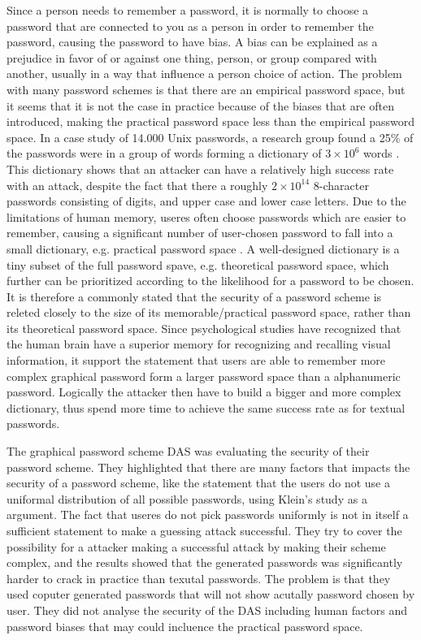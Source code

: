   Since a person needs to remember a password, it is normally to choose a password that are connected to you as a person in order to remember the password, causing the password to have bias. A bias can be explained as a prejudice in favor of or against one thing, person, or group compared with another, usually in a way that influence a person choice of action. The problem with many password schemes is that there are an empirical password space, but it seems that it is not the case in practice because of the biases that are often introduced, making the practical password space less than the empirical password space. In a case study of 14.000 Unix passwords, a research group found a 25\% of the passwords were in a group of words forming a dictionary of $3\times10^{6}$ words \cite{UnixPasswords}. This dictionary shows that an attacker can have a relatively high success rate with an attack, despite the fact that there a roughly $2\times10^{14}$ 8-character passwords consisting of digits, and upper case and lower case letters. Due to the limitations of human memory, useres often choose passwords which are easier to remember, causing a significant number of user-chosen password to fall into a small dictionary, e.g. practical password space \cite{Tao}. A well-designed dictionary is a tiny subset of the full password spave, e.g. theoretical password space, which further can be prioritized  according to the likelihood for a password to be chosen. It is therefore a commonly stated that the security of a password scheme is releted closely to the size of its memorable/practical password space, rather than its theoretical password space. Since psychological studies have recognized that the human brain have a superior memory for recognizing and recalling visual information, it support the statement that users are able to remember more complex graphical password form a larger password space than a alphanumeric password. Logically the attacker then have to build a bigger and more complex dictionary, thus spend more time to achieve the same success rate as for textual passwords. %

  The graphical password scheme DAS \cite{Jermyn} was evaluating the security of their password scheme. They highlighted that there are many factors that impacts the security of a password scheme, like the statement that the users do not use a uniformal distribution of all possible passwords, using Klein's study \cite{UnixPasswords} as a argument. The fact that useres do not pick passwords uniformly is not in itself a sufficient statement to make a guessing attack successful. They try to cover the possibility for a attacker making a successful attack by making their scheme complex, and the results showed that the generated passwords was significantly harder to crack in practice than texutal passwords. The problem is that they used coputer generated passwords that will not show acutally password chosen by user. They did not analyse the security of the DAS including human factors and password biases that may could incluence the practical password space. 
  

  